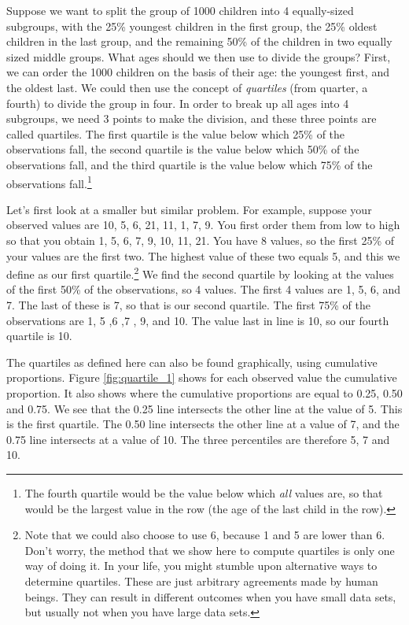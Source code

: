 \documentclass[]{book}\usepackage[]{graphicx}\usepackage[]{color}
\begin{document}
Suppose we want to split the group of 1000 children into 4 equally-sized subgroups, with the 25\% youngest children in the first group, the 25\% oldest children in the last group, and the remaining 50\% of the children in two equally sized middle groups. What ages should we then use to divide the groups? First, we can order the 1000 children on the basis of their age: the youngest first, and the oldest last. We could then use the concept of \textit{quartiles} (from quarter, a fourth) to divide the group in four. In order to break up all ages into 4 subgroups, we need 3 points to make the division, and these three points are called quartiles. The first quartile is the value below which 25\% of the observations fall, the second quartile is the value below which 50\% of the observations fall, and the third quartile is the value below which 75\% of the observations fall.\footnote{The fourth quartile would be the value below which \textit{all} values are, so that would be the largest value in the row (the age of the last child in the row).}

Let's first look at a smaller but similar problem. For example, suppose your observed values are {10, 5, 6, 21, 11, 1, 7, 9}. You first order them from low to high so that you obtain {1, 5, 6, 7, 9, 10, 11, 21}. You have 8 values, so the first 25\% of your values are the first two. The highest value of these two equals 5, and this we define as our first quartile.\footnote{Note that we could also choose to use 6,
because 1 and 5 are lower than 6. Don't worry, the method that we show here to compute quartiles is only one way of doing it. In your life, you might stumble upon alternative ways to determine quartiles. These are just arbitrary agreements made by human beings. They can result in different outcomes when you have small data sets, but usually not when you have large data sets.} We find the second quartile by looking at the values of the first 50\% of the observations, so 4 values. The first 4 values are 1, 5, 6, and 7. The last of these is 7, so that is our second quartile. The first 75\% of the observations are 1, 5 ,6 ,7 , 9, and 10. The value last in line is 10, so our fourth quartile is 10.

The quartiles as defined here can also be found graphically, using cumulative proportions. Figure \ref{fig:quartile_1} shows for each observed value the cumulative proportion. It also shows where the cumulative proportions are equal to 0.25, 0.50 and 0.75. We see that the 0.25 line intersects the other line at the value of 5. This is the first quartile. The 0.50 line intersects the other line at a value of 7, and the 0.75 line intersects at a value of 10. The three percentiles are therefore 5, 7 and 10.
\end{document}
